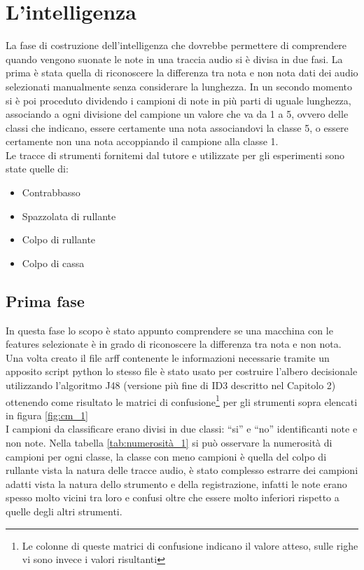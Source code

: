 \chapter{L'intelligenza}
La fase di costruzione dell'intelligenza che dovrebbe permettere di comprendere quando vengono suonate le note in una traccia audio si è divisa in due fasi. La prima è stata quella di riconoscere la differenza tra nota e non nota dati dei audio selezionati manualmente senza considerare la lunghezza. In un secondo momento si è poi proceduto dividendo i campioni di note in più parti di uguale lunghezza, associando a ogni divisione del campione un valore che va da 1 a 5, ovvero delle classi che indicano, essere certamente una nota associandovi la classe 5, o essere certamente non una nota accoppiando il campione alla classe 1.\\
Le tracce di strumenti fornitemi dal tutore e utilizzate per gli esperimenti sono state quelle di: 
\begin{itemize}
	\item Contrabbasso
	\item Spazzolata di rullante
	\item Colpo di rullante
	\item Colpo di cassa
\end{itemize}


\section{Prima fase}
In questa fase lo scopo è stato appunto comprendere se una macchina con le features selezionate è in grado di riconoscere la differenza tra nota e non nota. Una volta creato il file arff contenente le informazioni necessarie tramite un apposito script python lo stesso file è stato usato per costruire l'albero decisionale utilizzando l'algoritmo J48 (versione più fine di ID3 descritto nel Capitolo 2) ottenendo come risultato le matrici di confusione\footnote{Le colonne di queste matrici di confusione indicano il valore atteso, sulle righe vi sono invece i valori risultanti} per gli strumenti sopra elencati in figura \ref{fig:cm_1}\\

I campioni da classificare erano divisi in due classi: ``si'' e ``no'' identificanti note e non note. Nella tabella \ref{tab:numerosità_1} si può osservare la numerosità di campioni per ogni classe, la classe con meno campioni è quella del colpo di rullante vista la natura delle tracce audio, è stato complesso estrarre dei campioni adatti vista la natura dello strumento e della registrazione, infatti le note erano spesso molto vicini tra loro e confusi oltre che essere molto inferiori rispetto a quelle degli altri strumenti.

